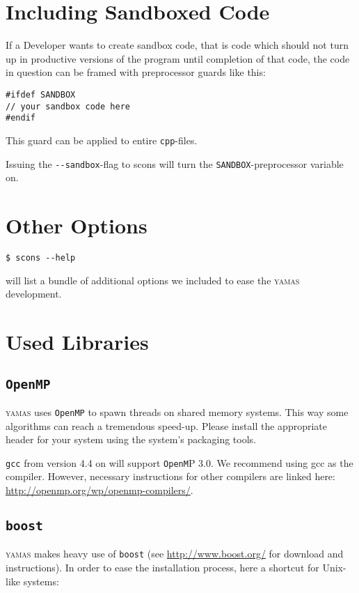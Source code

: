 \section{Including Sandboxed Code}

If a Developer wants to create sandbox code, that is code which should not turn up in productive versions of the program until completion of that code, the code in question can be framed with preprocessor guards like this:
\begin{lstlisting}[style=C++]
#ifdef SANDBOX
// your sandbox code here
#endif
\end{lstlisting}
This guard can be applied to entire \verb+cpp+-files.

Issuing the \verb+--sandbox+-flag to scons will turn the \verb+SANDBOX+-preprocessor variable on.


\section{Other Options}
\begin{lstlisting}[style=shell]
$ scons --help 
\end{lstlisting}
will list a bundle of additional options we included to ease the \textsc{yamas} development.

\section{Used Libraries}

\subsection{\texttt{OpenMP}}

\textsc{yamas} uses \texttt{OpenMP} to spawn threads on shared memory systems. This way some algorithms can reach a tremendous speed-up. Please install the appropriate header for your system using the system's packaging tools.

\texttt{gcc} from version 4.4 on will support \texttt{OpenM}P 3.0. We recommend using gcc as the compiler. However, necessary instructions for other compilers are linked here: \url{http://openmp.org/wp/openmp-compilers/}.

\subsection{\texttt{boost}}

\textsc{yamas} makes heavy use of \texttt{boost} (see \url{http://www.boost.org/} for download and instructions). In order to ease the installation process, here a shortcut for Unix-like systems:

